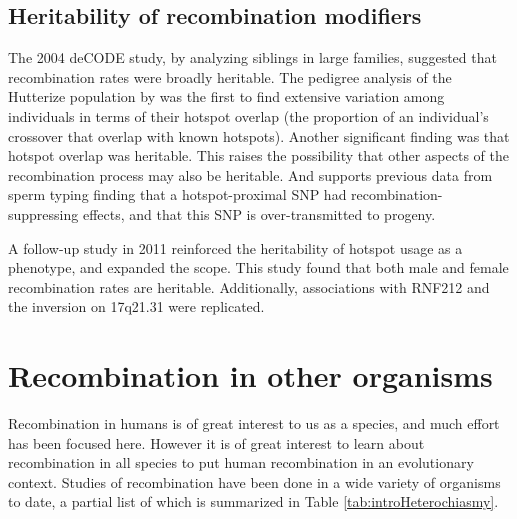 \subsection{Heritability of recombination modifiers}

The 2004 deCODE study, by analyzing siblings in large families, suggested that recombination rates were broadly heritable\cite{Kong2004}.
The pedigree analysis of the Hutterize population by \citet{Coop2008} was the first to find extensive variation among individuals in terms of their hotspot overlap (the proportion of an individual's crossover that overlap with known hotspots).
Another significant finding was that hotspot overlap was heritable.
This raises the possibility that other aspects of the recombination process may also be heritable.
And supports previous data from sperm typing finding that a hotspot-proximal SNP had recombination-suppressing effects, and that this SNP is over-transmitted to progeny\cite{Jeffreys2005}.

A follow-up study in 2011 reinforced the heritability of hotspot usage as a phenotype, and expanded the scope\cite{Fledel-Alon2011}.
This study found that both male and female recombination rates are heritable.
Additionally, associations with RNF212 and the inversion on 17q21.31 were replicated.




\section{Recombination in other organisms}


Recombination in humans is of great interest to us as a species, and much effort has been focused here.
However it is of great interest to learn about recombination in all species to put human recombination in an evolutionary context.
Studies of recombination have been done in a wide variety of organisms to date, a partial list of which is summarized in Table \ref{tab:introHeterochiasmy}.

